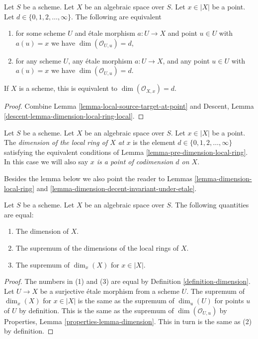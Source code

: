 \begin{lemma}
\label{lemma-pre-dimension-local-ring}
Let $S$ be a scheme.
Let $X$ be an algebraic space over $S$.
Let $x \in |X|$ be a point.
Let $d \in \{0, 1, 2, \ldots, \infty\}$.
The following are equivalent
\begin{enumerate}
\item for some scheme $U$ and \'etale morphism $a : U \to X$ and point
$u \in U$ with $a(u) = x$ we have $\dim(\mathcal{O}_{U, u}) = d$,
\item for any scheme $U$, any \'etale morphism $a : U \to X$, and any point
$u \in U$ with $a(u) = x$ we have $\dim(\mathcal{O}_{U, u}) = d$.
\end{enumerate}
If $X$ is a scheme, this is equivalent to $\dim(\mathcal{O}_{X, x}) = d$.
\end{lemma}

\begin{proof}
Combine
Lemma \ref{lemma-local-source-target-at-point} and
Descent, Lemma \ref{descent-lemma-dimension-local-ring-local}.
\end{proof}

\begin{definition}
\label{definition-dimension-local-ring}
Let $S$ be a scheme. Let $X$ be an algebraic space over $S$. Let $x \in |X|$
be a point. The {\it dimension of the local ring of $X$ at $x$} is
the element $d \in \{0, 1, 2, \ldots, \infty\}$ satisfying the equivalent
conditions of Lemma \ref{lemma-pre-dimension-local-ring}. In this case we
will also say {\it $x$ is a point of codimension $d$ on $X$}.
\end{definition}

\noindent
Besides the lemma below we also point the reader to
Lemmas \ref{lemma-dimension-local-ring} and
\ref{lemma-dimension-decent-invariant-under-etale}.

\begin{lemma}
\label{lemma-dimension}
Let $S$ be a scheme. Let $X$ be an algebraic space over $S$.
The following quantities are equal:
\begin{enumerate}
\item The dimension of $X$.
\item The supremum of the dimensions of the local rings of $X$.
\item The supremum of $\dim_x(X)$ for $x \in |X|$.
\end{enumerate}
\end{lemma}

\begin{proof}
The numbers in (1) and (3) are equal by Definition \ref{definition-dimension}.
Let $U \to X$ be a surjective \'etale morphism from a scheme $U$.
The supremum of $\dim_x(X)$ for $x \in |X|$ is the same as the
supremum of $\dim_u(U)$ for points $u$ of $U$ by definition.
This is the same as the supremum of $\dim(\mathcal{O}_{U, u})$ by
Properties, Lemma \ref{properties-lemma-dimension}. This in turn
is the same as (2) by definition.
\end{proof}




